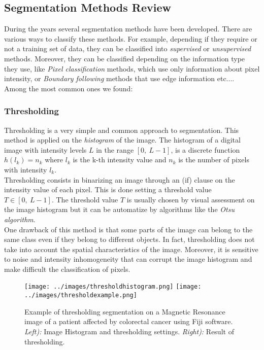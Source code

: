 \documentclass{standalone}
\begin{document}
\subsection{Segmentation Methods Review}
During the years several segmentation methods have been developed\cite{biondi}.
There are various ways to classify these methods.
For example, depending if they require or not a training set of data, they can be classified into \textit{supervised} or \textit{unsupervised} methods.
Moreover, they can be classified depending on the information type they use, like \textit{Pixel classification} methods, which use only information about pixel intensity, or \textit{Boundary following} methods that use edge information etc...\cite{biondi}.\\
Among the most common ones we found:

\subsubsection{Thresholding}
Thresholding is a very simple and common approach to segmentation.
This method is applied on the \textit{histogram} of the image.
The histogram of a digital image with intensity levels $L$ in the range $[0, \: L-1]$, is a discrete function $h(l_k) = n_k$ where $l_k$ is the k-th intensity value and $n_k$  is the number of pixels with intensity $l_k$.\\
Thresholding consists in binarizing an image through an (if) clause on the intensity value of each pixel.
This is done setting a threshold value $T \in [0, \: L-1]$.
The threshold value $T$ is usually chosen by visual assessment on the image histogram but it can be automatize by algorithms like the \textit{Otsu algorithm}.\\
One drawback of this method is that some parts of the image can belong to the same class even if they belong to different objects.
In fact, thresholding does not take into account the spatial characteristics of the image.
Moreover, it is sensitive to noise and intensity inhomogeneity that can corrupt the image histogram and make difficult the classification of pixels\cite{biondi}.

\begin{figure}[htp]

    \centering
    \texttt{[image: ../images/thresholdhistogram.png]}
    \texttt{[image: ../images/thresholdexample.png]}
    
    \caption{Example of thresholding segmentation on a Magnetic Resonance image of a patient affected by colorectal cancer using Fiji software\cite{Fiji}. \\
    \textit{ Left):} Image Histogram and thresholding settings.\textit{ Right):} Result of thresholding. }
    \label{thresholding}
    
    \end{figure}
\end{document}
